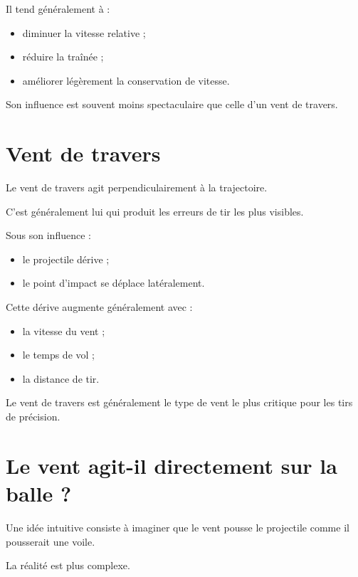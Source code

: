Il tend généralement à :

\begin{itemize}
\item diminuer la vitesse relative ;
\item réduire la traînée ;
\item améliorer légèrement la conservation de vitesse.
\end{itemize}

Son influence est souvent moins spectaculaire que celle d'un vent de
travers.

\section{Vent de travers}

Le vent de travers agit perpendiculairement à la trajectoire.

C'est généralement lui qui produit les erreurs de tir les plus visibles.

Sous son influence :

\begin{itemize}
\item le projectile dérive ;
\item le point d'impact se déplace latéralement.
\end{itemize}

Cette dérive augmente généralement avec :

\begin{itemize}
\item la vitesse du vent ;
\item le temps de vol ;
\item la distance de tir.
\end{itemize}

\begin{aretenir}

Le vent de travers est généralement le type de vent le plus critique pour
les tirs de précision.

\end{aretenir}

\section{Le vent agit-il directement sur la balle ?}

Une idée intuitive consiste à imaginer que le vent pousse le projectile
comme il pousserait une voile.

La réalité est plus complexe.

